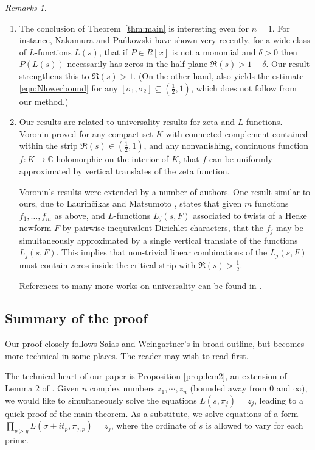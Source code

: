 \documentclass[11pt]{amsart}
\theoremstyle{remark}
\newtheorem*{remarks}{Remarks}
\numberwithin{theorem}{section}
\numberwithin{equation}{section}
\newcommand{\C}{\mathbb{C}}
\begin{document}
\begin{remarks}
\begin{enumerate}
\item The conclusion of Theorem~\ref{thm:main} is interesting
even for $n=1$. For instance, Nakamura and Pa\'nkowski \cite {np}
have shown very recently, for a wide class of $L$-functions $L(s)$,
that if $P\in R[x]$ is not a monomial and $\delta>0$ then $P(L(s))$
necessarily has zeros in the half-plane $\Re(s)>1-\delta$. Our result
strengthens this to $\Re(s)>1$. (On the other hand,
\cite{np} also yields the estimate \eqref{eqn:Nlowerbound} for any
$[\sigma_1,\sigma_2]\subseteq(\frac12,1)$, which does not follow from
our method.)

\item Our results are related to universality results 
for zeta and $L$-functions. Voronin \cite{voronin} proved for any compact
set $K$ with connected complement contained within the strip $\Re(s) \in (\frac12, 1)$, and any nonvanishing, continuous 
function $f :  K \rightarrow \C$ holomorphic on the interior of $K$, that $f$ can be uniformly
approximated by vertical translates of the zeta function. 

Voronin's results were extended
by a number of authors. One result similar to ours, due to
Laurin\v{c}ikas and Matsumoto \cite{LM}, states that given $m$ functions $f_1, \dots, f_m$ as above, and
$L$-functions $L_j(s, F)$ associated to twists of a Hecke newform $F$ by pairwise inequivalent Dirichlet characters, that the $f_j$ may
be simultaneously approximated by a single vertical translate of the functions $L_j(s, F)$.
This implies \cite[Theorem 4]{LM} that non-trivial linear combinations of the $L_j(s, F)$ must
contain zeros inside the critical strip with $\Re(s) > \frac{1}{2}$.

References to many more works on universality can be found in \cite{LM}.

\end{enumerate}
\end{remarks}

\subsection*{Summary of the proof} Our proof closely follows Saias and Weingartner's in broad outline, but becomes more technical in
some places. The reader may wish to read \cite{SW} first.

The technical heart of our paper is Proposition \ref{prop:lem2}, an extension of Lemma 2 of \cite{SW}. 
Given $n$ complex numbers $z_1, \cdots, z_n$ (bounded away from $0$ and $\infty$), we would like to 
simultaneously solve the equations $L(s, \pi_j) = z_j$, leading to a quick proof of the main theorem.
As a substitute, we solve equations of a form $\prod_{p > y} L(\sigma + it_p, \pi_{j, p}) = z_j$, where the ordinate of $s$ is allowed to vary for each
prime.
\end{document}
